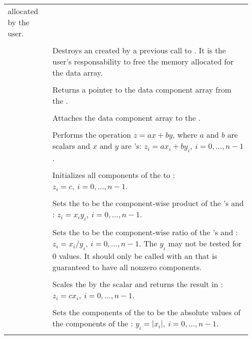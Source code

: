 \begin{supertabular}{|p{\colone}|p{\coltwo}|}
 allocated by the user.
\\
%
 &  \\
& Destroys an  created by a previous call to . 
It is the user's responsability to free the memory allocated for the data array.
\\
%
 &  \\
& Returns a pointer to the data component array from the  .
\\
%
 &  \\
& Attaches the data component array  to the  .
\\
%
 &  \\
& Performs the operation $z = a x + b y$, where $a$ and $b$ are scalars
and $x$ and $y$ are 's:
$z_i = a x_i + b y_i, \: i=0,\ldots,n-1$.
\\
%
 &  \\
& Initializes all components of the   to :
$z_i = c,\: i=0,\ldots,n-1$.
\\
%
 &  \\
& Sets the   to be the component-wise product of the
's  and :
$z_i = x_i y_i,\: i=0,\ldots,n-1$.
\\
%
 &  \\
& Sets the   to be the component-wise ratio of the
's  and :
$z_i = x_i / y_i,\: i=0,\ldots,n-1$. The $y_i$ may not be tested 
for $0$ values. It should only be called with an  that is
guaranteed to have all nonzero components.
\\
%
 &  \\
& Scales the   by the scalar  and returns
the result in :
$z_i = c x_i , \: i=0,\ldots,n-1$.
\\
%
 &  \\
& Sets the components of the   to be the absolute
values of the components of the  :
$y_i = | x_i | , \: i=0,\ldots,n-1$.
\\
%
 &  \\

\end{supertabular}
